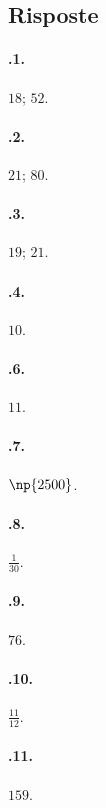 \subsection{Risposte}
\begin{multicols}{2}
\paragraph{\thechapter.1.}
$18$; $52$.

\paragraph{\thechapter.2.}
$21$; $80$.

\paragraph{\thechapter.3.}
$19$; $21$.

\paragraph{\thechapter.4.}
$10$.

\paragraph{\thechapter.6.}
$11$.

\paragraph{\thechapter.7.}
$\np{2500}$.

\paragraph{\thechapter.8.}
$\frac{1}{30}$.

\paragraph{\thechapter.9.}
$76$.

\paragraph{\thechapter.10.}
$\frac{11}{12}$.

\paragraph{\thechapter.11.}
$159$.


\end{multicols}
